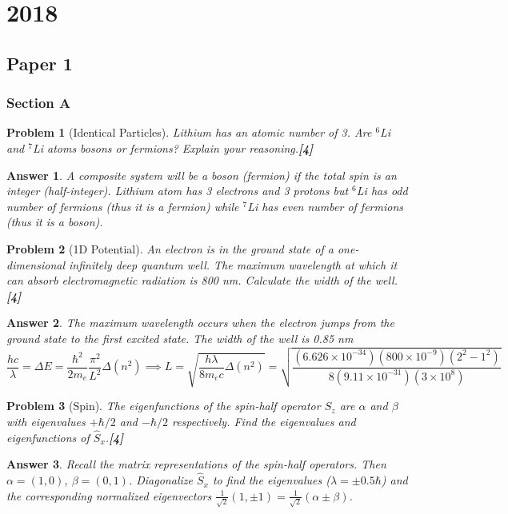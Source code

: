 \documentclass[a4paper]{article}
\newtheorem{ans}{Answer}[subsection]
\theoremstyle{new}
\newtheorem{qns}{Problem}[subsection]
\begin{document}
\section{2018}
\subsection{Paper 1}
\subsubsection{Section A}
\begin{qns}[Identical Particles]
Lithium has an atomic number of 3. Are $^6$Li and $^7$Li atoms bosons or fermions? Explain your reasoning.\hfill\textbf{[4]}
\end{qns}
\begin{ans}
A composite system will be a boson (fermion) if the total spin is an integer (half-integer). Lithium atom has 3 electrons and 3 protons but $^6$Li has odd number of fermions (thus it is a fermion) while $^7$Li has even number of fermions (thus it is a boson).
\end{ans}
\begin{qns}[1D Potential]
An electron is in the ground state of a one-dimensional infinitely deep quantum well. The maximum wavelength at which it can absorb electromagnetic radiation is 800 nm. Calculate the width of the well.\hfill\textbf{[4]}
\end{qns}
\begin{ans}
The maximum wavelength occurs when the electron jumps from the ground state to the first excited state. The width of the well is 0.85 nm
$$\frac{hc}{\lambda}=\Delta E=\frac{\hbar^2}{2m_e}\frac{\pi^2}{L^2}\Delta(n^2)\implies L=\sqrt{\frac{h\lambda}{8m_ec}\Delta(n^2)}=\sqrt{\frac{(6.626\times10^{-34})(800\times10^{-9})(2^2-1^2)}{8(9.11\times10^{-31})(3\times10^8)}}$$
\end{ans}
\begin{qns}[Spin]
The eigenfunctions of the spin-half operator $\hat{S}_z$ are $\alpha$ and $\beta$ with eigenvalues $+\hbar/2$ and $-\hbar/2$ respectively. Find the eigenvalues and eigenfunctions of $\hat{S}_x$.\hfill\textbf{[4]}
\end{qns}
\begin{ans}
Recall the matrix representations of the spin-half operators. Then $\alpha=(1,0)$, $\beta=(0,1)$. Diagonalize $\hat{S}_x$ to find the eigenvalues ($\lambda=\pm0.5\hbar$) and the corresponding normalized eigenvectors $\frac{1}{\sqrt{2}}(1,\pm1)=\frac{1}{\sqrt{2}}(\alpha\pm\beta)$. 
\end{ans}
\end{document}
